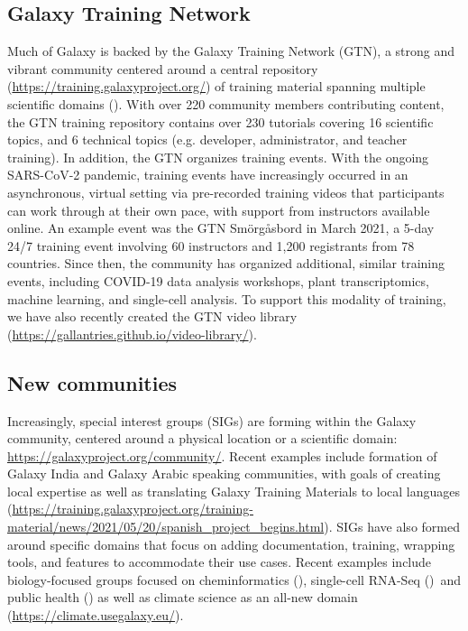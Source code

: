 \subsection*{Galaxy Training Network}
Much of Galaxy is backed by the Galaxy Training Network (GTN), a strong and vibrant community centered around a central repository (\url{https://training.galaxyproject.org/}) of training material spanning multiple scientific domains (\cite{batut2018community}). With over 220 community members contributing content, the GTN training repository contains over 230 tutorials covering 16 scientific topics, and 6 technical topics (e.g. developer, administrator, and teacher training). In addition, the GTN organizes training events. With the ongoing SARS-CoV-2 pandemic, training events have increasingly occurred in an asynchronous, virtual setting via pre-recorded training videos that participants can work through at their own pace, with support from instructors available online. An example event was the GTN Smörgåsbord in March 2021, a 5-day 24/7 training event involving 60 instructors and 1,200 registrants from 78 countries. Since then, the community has organized additional, similar training events, including COVID-19 data analysis workshops, plant transcriptomics, machine learning, and single-cell analysis. To support this modality of training, we have also recently created the GTN video library (\url{https://gallantries.github.io/video-library/}).


\subsection*{New communities}
Increasingly, special interest groups (SIGs) are forming within the Galaxy community, centered around a physical location or a scientific domain: \url{https://galaxyproject.org/community/}. Recent examples include formation of Galaxy India and Galaxy Arabic speaking communities, with goals of creating local expertise as well as translating Galaxy Training Materials to local languages (\url{https://training.galaxyproject.org/training-material/news/2021/05/20/spanish_project_begins.html}). SIGs have also formed around specific domains that focus on adding documentation, training, wrapping tools, and features to accommodate their use cases. Recent examples include biology-focused groups focused on cheminformatics (\cite{Bray_2020}), single-cell RNA-Seq (\cite{Moreno_2021}) and public health (\cite{Gangiredla_2021}) as well as climate science as an all-new domain (\url{https://climate.usegalaxy.eu/}).

